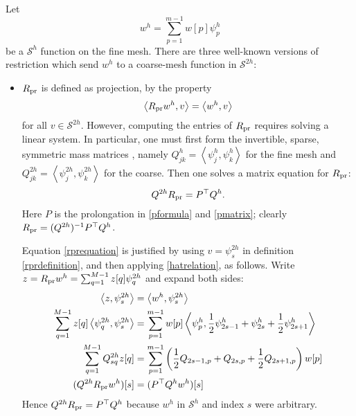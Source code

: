 \documentclass[letterpaper,final,12pt,reqno]{amsart}
\newcommand{\ip}[2]{\left<#1,#2\right>}
\begin{document}
Let
\begin{equation}
  w^h = \sum_{p=1}^{m-1} w[p] \psi_p^{h} \label{wfine}
\end{equation}
be a $\mathcal{S}^h$ function on the fine mesh.  There are three well-known versions of restriction which send $w^h$ to a coarse-mesh function in $\mathcal{S}^{2h}$:
\begin{itemize}
\item $R_{\text{pr}}$ is defined as projection, by the property
\begin{equation}
  \ip{\Rpr w^h}{v} = \ip{w^h}{v} \label{rprdefinition}
\end{equation}
for all $v\in \mathcal{S}^{2h}$.  However, computing the entries of $R_{\text{pr}}$ requires solving a linear system.  In particular, one must first form the invertible, sparse, symmetric mass matrices \cite{Elmanetal2014}, namely $Q_{jk}^{h} = \ip{\psi_j^{h}}{\psi_k^{h}}$ for the fine mesh and $Q_{jk}^{2h} = \ip{\psi_j^{2h}}{\psi_k^{2h}}$ for the coarse.  Then one solves a matrix equation for $R_{\text{pr}}$:
\begin{equation}
  Q^{2h} R_{\text{pr}} = P^\top Q^{h}.  \label{rprequation}
\end{equation}
Here $P$ is the prolongation in \eqref{pformula} and \eqref{pmatrix}; clearly $R_{\text{pr}} = (Q^{2h})^{-1} P^\top Q^{h}$.

Equation \eqref{rprequation} is justified by using $v=\psi_s^{2h}$ in definition \eqref{rprdefinition}, and then applying \eqref{hatrelation}, as follows.  Write $z = R_{\text{pr}} w^h = \sum_{q=1}^{M-1} z[q] \psi_q^{2h}$ and expand both sides:
\begin{align*}
\ip{z}{\psi_s^{2h}} &= \ip{w^h}{\psi_s^{2h}} \\
\sum_{q=1}^{M-1} z[q] \ip{\psi_q^{2h}}{\psi_s^{2h}} &= \sum_{p=1}^{m-1} w[p] \ip{\psi_p^{h}}{\frac{1}{2} \psi_{2s-1}^{h} + \psi_{2s}^{h} + \frac{1}{2} \psi_{2s+1}^{h}} \\
\sum_{q=1}^{M-1} Q_{sq}^{2h} z[q] &= \sum_{p=1}^{m-1} \left(\frac{1}{2} Q_{2s-1,p} + Q_{2s,p} + \frac{1}{2} Q_{2s+1,p}\right) w[p] \\
(Q^{2h} \Rpr w^h)[s] &= (P^\top Q^h w^h)[s]
\end{align*}
Hence $Q^{2h} R_{\text{pr}} = P^\top Q^h$ because $w^h$ in $\mathcal{S}^h$ and index $s$ were arbitrary.


\end{itemize}
\end{document}
